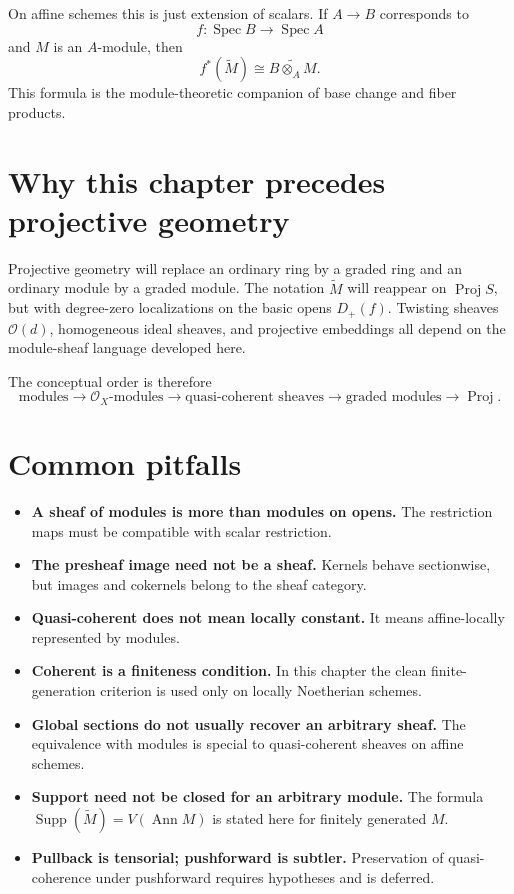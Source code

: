 On affine schemes this is just extension of scalars.  If $A\to B$ corresponds to
\[
f:\operatorname{Spec}B\to\operatorname{Spec}A
\]
and $M$ is an $A$-module, then
\[
\boxed{f^*(\widetilde M)\cong\widetilde{B\otimes_A M}.}
\]
This formula is the module-theoretic companion of base change and fiber products.



\section{Why this chapter precedes projective geometry}
Projective geometry will replace an ordinary ring by a graded ring and an ordinary module by a graded module.  The notation $\widetilde M$ will reappear on $\operatorname{Proj}S$, but with degree-zero localizations on the basic opens $D_+(f)$.  Twisting sheaves $\mathcal O(d)$, homogeneous ideal sheaves, and projective embeddings all depend on the module-sheaf language developed here.

The conceptual order is therefore
\[
\boxed{
\text{modules}\to\mathcal O_X\text{-modules}\to\text{quasi-coherent sheaves}
\to\text{graded modules}\to\operatorname{Proj}.}
\]

\section{Common pitfalls}
\begin{itemize}
\item \textbf{A sheaf of modules is more than modules on opens.}  The restriction maps must be compatible with scalar restriction.
\item \textbf{The presheaf image need not be a sheaf.}  Kernels behave sectionwise, but images and cokernels belong to the sheaf category.
\item \textbf{Quasi-coherent does not mean locally constant.}  It means affine-locally represented by modules.
\item \textbf{Coherent is a finiteness condition.}  In this chapter the clean finite-generation criterion is used only on locally Noetherian schemes.
\item \textbf{Global sections do not usually recover an arbitrary sheaf.}  The equivalence with modules is special to quasi-coherent sheaves on affine schemes.
\item \textbf{Support need not be closed for an arbitrary module.}  The formula $\operatorname{Supp}(\widetilde M)=V(\operatorname{Ann}M)$ is stated here for finitely generated $M$.
\item \textbf{Pullback is tensorial; pushforward is subtler.}  Preservation of quasi-coherence under pushforward requires hypotheses and is deferred.
\end{itemize}

